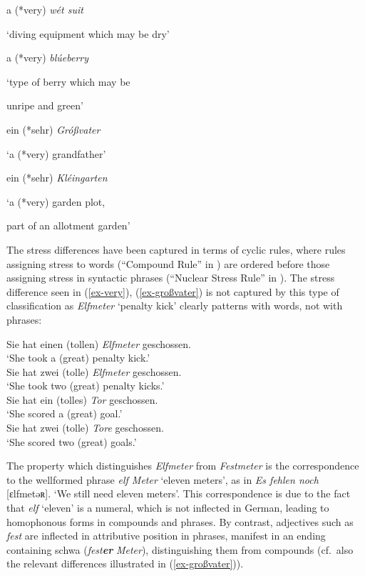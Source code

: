 \documentclass[output=paper
 ,nobabel
 ,draftmode
 ,colorlinks, citecolor=brown
]{langscibook}
\begin{document}
\settowidth{}
\ea\label{ex-very}
\ea a (*very) \emph{wét suit} 

`diving equipment which may be dry' 

\ex a (*very) \emph{blúeberry} 

`type of berry	which may be  

unripe and green'
\z

\ex\label{ex-großvater}
\ea ein (*sehr) \emph{Gróßvater} 

`a (*very) grandfather' 

\ex ein (*sehr) \emph{Kléingarten} 

`a (*very) garden plot, 

part of an allotment garden'
\z
\z

\noindent
The stress differences have been captured in terms of cyclic rules, where rules assigning stress to words (``Compound Rule'' in \citealp[17]{ChomskyHalle1968}) are ordered before those assigning stress in syntactic phrases (``Nuclear Stress Rule'' in \citealp[17]{ChomskyHalle1968}). The stress difference seen in (\ref{ex-very}), (\ref{ex-großvater}) is not captured by this type of classification as \emph{Elfmeter} `penalty kick' clearly patterns with words, not with phrases:

\eal\label{elfmeter}
\ex Sie hat einen (tollen) \emph{Elfmeter} geschossen. \\
`She took a (great) penalty kick.' \\

\ex Sie hat zwei (tolle) \emph{Elfmeter} geschossen. \\
	 `She took two (great) penalty kicks.' \\
\ex	Sie hat ein (tolles) \emph{Tor} geschossen. \\
	 `She scored a  (great) goal.' \\
\ex	Sie hat zwei (tolle) \emph{Tore} geschossen. \\
	 `She scored two (great) goals.'
\zl

\noindent
The property which distinguishes \emph{Elfmeter} from \emph{Festmeter} is the correspondence to the wellformed phrase \emph{elf Meter} `eleven meters', as in \emph{Es fehlen noch} [ɛlfmetəʀ]. `We still need eleven meters'. This correspondence is due to the fact that \emph{elf} `eleven' is a numeral, which is not inflected in German, leading to homophonous forms in compounds and phrases. By contrast, adjectives such as \emph{fest} are inflected in attributive position in phrases, manifest in an ending containing schwa (\eg \emph{fest}\textbf{\emph{er}} \emph{Meter}), distinguishing them from compounds (cf.\ also the relevant differences illustrated in (\ref{ex-großvater})).
\end{document}
